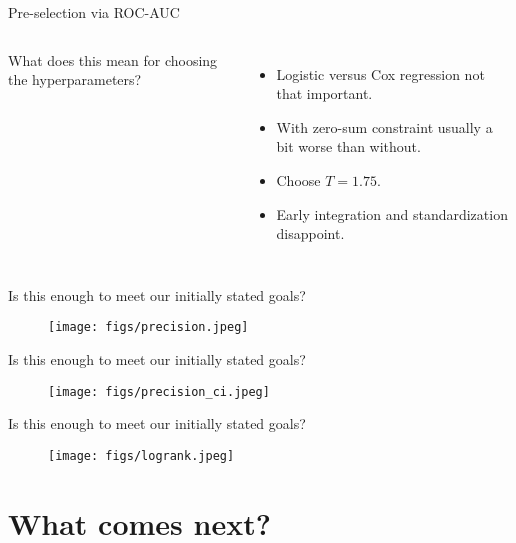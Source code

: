 \documentclass[10pt, aspectratio=169]{beamer}
\begin{document}
\begin{frame}{Pre-selection via ROC-AUC}
  \begin{columns}
    {
      \small
      
    }
      What does this mean for choosing the hyperparameters?
      \begin{itemize}
        \item Logistic versus Cox regression not that important.
        \item With zero-sum constraint usually a bit worse than without.
        \item Choose $T = 1.75$.
        \item Early integration and standardization disappoint.
      \end{itemize}
  \end{columns}
\end{frame}

\begin{frame}{Is this enough to meet our initially stated goals?}
  \begin{figure}[h]
    \centering
    \texttt{[image: figs/precision.jpeg]}
  \end{figure}
\end{frame}

\begin{frame}{Is this enough to meet our initially stated goals?}
  \begin{figure}[h]
    \centering
    \texttt{[image: figs/precision\_ci.jpeg]}
  \end{figure}
\end{frame}

\begin{frame}{Is this enough to meet our initially stated goals?}
  \begin{figure}[h]
    \centering
    \texttt{[image: figs/logrank.jpeg]}
  \end{figure}
\end{frame}

\section{What comes next?}
\end{document}
